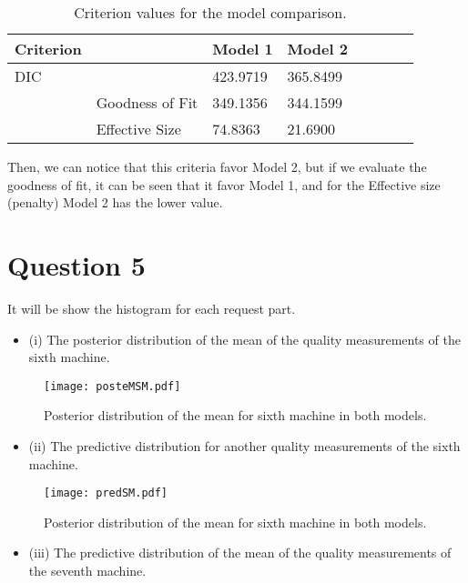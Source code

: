 \documentclass[a4paper, 11pt]{article}
\begin{document}
\begin{table}[H]
\caption{Criterion values for the model comparison.}\label{criter}
\centering
\begin{tabular}{llllllcc}
\hline
Criterion & & Model 1 & Model 2 \\
\hline

DIC & & 423.9719 & 365.8499  \\
& Goodness of Fit &  349.1356 & 344.1599 \\
& Effective Size  & 74.8363 & 21.6900\\
\hline
\end{tabular}
\end{table}

Then, we can notice that this criteria favor Model 2, but if we evaluate the goodness of fit, it can be seen that it favor Model 1, and for the Effective size (penalty) Model 2 has the lower value. 

\section*{Question 5}

It will be show the histogram for each request part.

\begin{itemize}
\item (i) The posterior distribution of the mean of the quality measurements of the sixth machine.
\end{itemize}

\begin{figure}[H]
\centering
\caption{Posterior distribution of the mean for sixth machine in both models.}
\label{Fig2}
\texttt{[image: posteMSM.pdf]}
\end{figure}

\begin{itemize}
\item (ii) The predictive distribution for another quality measurements of the sixth machine.
\end{itemize}

\begin{figure}[H]
\centering
\caption{Posterior distribution of the mean for sixth machine in both models.}
\label{Fig3}
\texttt{[image: predSM.pdf]}
\end{figure}

\begin{itemize}
\item (iii) The predictive distribution of the mean of the quality measurements of the seventh machine.
\end{itemize}
\end{document}

